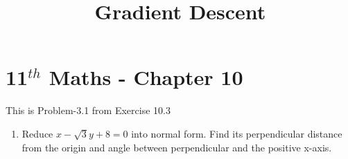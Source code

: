 \documentclass[12pt]{article}
\begin{document}
\begin{center}
\title{\textbf{Gradient Descent}}
\date{\vspace{-5ex}} %
\maketitle
\end{center}
\setcounter{page}{1}

\section{11$^{th}$ Maths - Chapter 10}
This is Problem-3.1 from Exercise 10.3 
\begin{enumerate}
\item Reduce $x-\sqrt{3}y+8=0$ into normal form. Find its perpendicular distance from the origin and angle between perpendicular and the positive x-axis. 


\end{enumerate}
\end{document}
